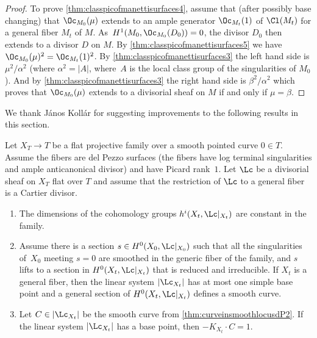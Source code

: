 \begin{proof}
To prove \eqref{thm:classpicofmanettisurfaces4}, assume that (after possibly base changing) that $\Oc_{M_0}(\mu)$ extends to an ample generator $\Oc_{M_t}(1)$ of $\Cl(M_t)$ for a general fiber $M_t$ of $M$.
As~$H^1(M_0, \Oc_{M_0}(D_0)) = 0$, the divisor $D_0$ then extends to a divisor $D$ on $M$. By \eqref{thm:classpicofmanettisurfaces5} we have $\Oc_{M_0}(\mu)^2 = \Oc_{M_t}(1)^2$. By \eqref{thm:classpicofmanettisurfaces3} the left hand side is $\mu^2/\alpha^2$ (where $\alpha^2 = |A|$, where~$A$ is the local class group of the singularities of $M_0$). And by \eqref{thm:classpicofmanettisurfaces3} the right hand side is $\beta^2/\alpha^2$ which proves that $\Oc_{M_0}(\mu)$ extends to a divisorial sheaf on $M$ if and only if $\mu = \beta$.
\end{proof}

We thank János Kollár for suggesting improvements to the following results in this section.

\begin{theorem}\label{thm:curveinsmoothlocusdP}
Let $X_T\to T$ be a flat projective family over a smooth pointed curve $0\in T$. Assume the fibers are del Pezzo surfaces (\ie the fibers have log terminal singularities and ample anticanonical divisor) and have Picard rank~$1$. Let $\Lc$ be a divisorial sheaf on $X_T$ flat over $T$ and assume that the restriction of $\Lc$ to a general fiber is a Cartier divisor.
\begin{enumerate}
\item\label{thm:curveinsmoothlocusdP1} The dimensions of the cohomology groups $h^i(X_t,\Lc|_{X_t})$ are constant in the family.
\item\label{thm:curveinsmoothlocusdP2} Assume there is a section $s\in H^0(X_0,\Lc|_{X_0})$ such that all the singularities of~$X_0$ meeting $s=0$ are smoothed in the generic fiber of the family, and $s$ lifts to a section in $H^0(X_t,\Lc|_{X_t})$ that is reduced and irreducible. If $X_t$ is a general fiber, then the linear system $|\Lc_{X_t}|$ has at most one simple base point and a general section of $H^0(X_t,\Lc|_{X_t})$ defines a smooth curve.
\item\label{thm:curveinsmoothlocusdP3} Let $C \in |\Lc_{X_t}| $ be the smooth curve from \eqref{thm:curveinsmoothlocusdP2}. If the linear system $|\Lc_{X_t}|$ has a base point, then $-K_{X_t}\cdot C = 1$.
\end{enumerate}
\end{theorem}

